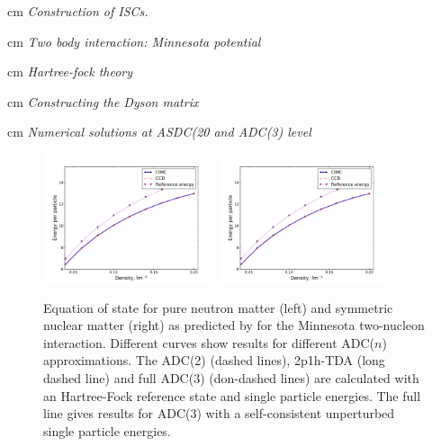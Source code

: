  cm
{\em Construction of ISCs.}

 cm
{\em Two body interaction: Minnesota potential}

 cm
{\em Hartree-fock theory}

 cm
{\em Constructing the Dyson matrix}

 cm
{\em Numerical solutions at ASDC(20 and ADC(3) level}



\begin{figure}[t]
\begin{center}
\includegraphics[width=0.45\textwidth]{Chapter11-figures/cimcccd.pdf}
\includegraphics[width=0.45\textwidth]{Chapter11-figures/cimcccd.pdf}
\caption{Equation of state for pure neutron matter (left) and symmetric nuclear matter (right) as predicted by for the Minnesota two-nucleon interaction. Different curves show results for different ADC($n$) approximations. The ADC(2) (dashed lines), 2p1h-TDA (long dashed line) and full ADC(3) (don-dashed lines) are calculated with an Hartree-Fock reference state and single particle energies. The full line gives results for ADC(3) with a self-consistent unperturbed single particle energies.}
\label{fig:minn_adc_eos}
\end{center}
\end{figure}



